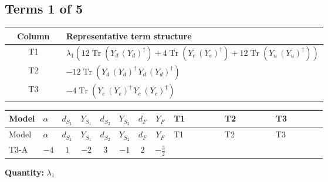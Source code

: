 \documentclass[8pt]{article}
\begin{document}
\begin{landscape}
\subsection*{Terms 1 of 5}
\begin{center}
\begin{tabular}{@{}c >{\raggedright\arraybackslash}p{0.82\linewidth}@{}}
\toprule
Column & Representative term structure \\
\midrule
T1 & \(\displaystyle {\lambda_1} (12 \operatorname{Tr}\!\left({Y_d}\,\left({Y_d}\right)^{\dagger}\right)+4 \operatorname{Tr}\!\left({Y_e}\,\left({Y_e}\right)^{\dagger}\right)+12 \operatorname{Tr}\!\left({Y_u}\,\left({Y_u}\right)^{\dagger}\right))\) \\
\midrule
T2 & \(\displaystyle -12 \operatorname{Tr}\!\left({Y_d}\,\left({Y_d}\right)^{\dagger}\,{Y_d}\,\left({Y_d}\right)^{\dagger}\right)\) \\
\midrule
T3 & \(\displaystyle -4 \operatorname{Tr}\!\left({Y_e}\,\left({Y_e}\right)^{\dagger}\,{Y_e}\,\left({Y_e}\right)^{\dagger}\right)\) \\
\midrule
\bottomrule
\end{tabular}
\end{center}
\smallskip
\tiny
\begin{longtable}{@{}llcccccc >{\raggedright\arraybackslash}p{0.21\linewidth} >{\raggedright\arraybackslash}p{0.21\linewidth} >{\raggedright\arraybackslash}p{0.21\linewidth}@{}}
\toprule
Model & $\alpha$ & $d_{S_1}$ & $Y_{S_1}$ & $d_{S_2}$ & $Y_{S_2}$ & $d_F$ & $Y_F$ & T1 & T2 & T3 \\
\midrule
\endfirsthead
\toprule
Model & $\alpha$ & $d_{S_1}$ & $Y_{S_1}$ & $d_{S_2}$ & $Y_{S_2}$ & $d_F$ & $Y_F$ & T1 & T2 & T3 \\
\midrule
\endhead
T3-A & $-4$ & $1$ & $-2$ & $3$ & $-1$ & $2$ & $-\frac{3}{2}$ & \scriptsize\adjustbox{max width=\linewidth}{$\begin{gathered} {\lambda_1} (12 \operatorname{Tr}\!\left({Y_d}\,\left({Y_d}\right)^{\dagger}\right)+4 \operatorname{Tr}\!\left({Y_e}\,\left({Y_e}\right)^{\dagger}\right)+12 \operatorname{Tr}\!\left({Y_u}\,\left({Y_u}\right)^{\dagger}\right))\end{gathered}$} & \scriptsize\adjustbox{max width=\linewidth}{$\begin{gathered} -12 \operatorname{Tr}\!\left({Y_d}\,\left({Y_d}\right)^{\dagger}\,{Y_d}\,\left({Y_d}\right)^{\dagger}\right)\end{gathered}$} & \scriptsize\adjustbox{max width=\linewidth}{$\begin{gathered} -4 \operatorname{Tr}\!\left({Y_e}\,\left({Y_e}\right)^{\dagger}\,{Y_e}\,\left({Y_e}\right)^{\dagger}\right)\end{gathered}$} \\
\midrule
\bottomrule
\end{longtable}
\clearpage
\noindent\textbf{Quantity: }$\lambda_1$\par\smallskip

\end{landscape}
\end{document}
